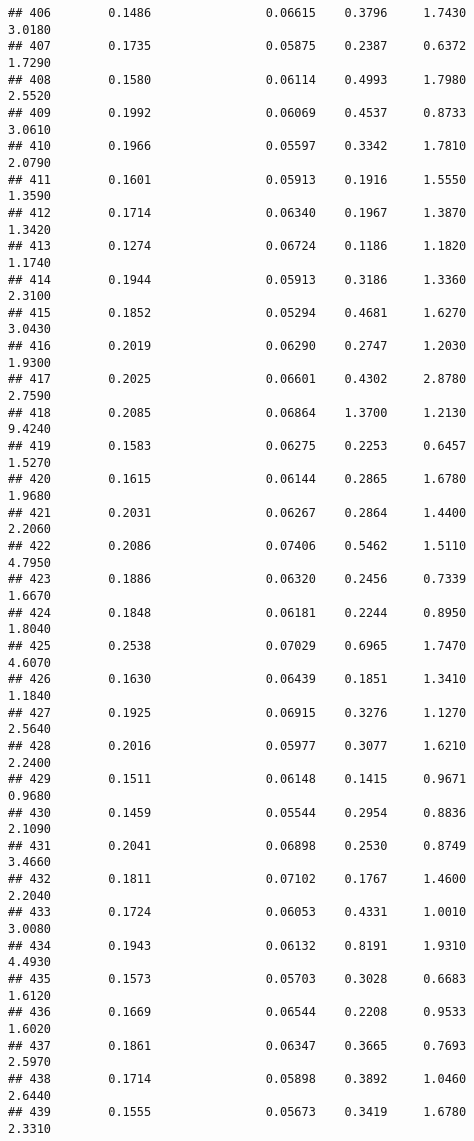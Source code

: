 \documentclass[
]{article}
\begin{document}
\begin{verbatim}
## 406        0.1486                0.06615    0.3796     1.7430       3.0180
## 407        0.1735                0.05875    0.2387     0.6372       1.7290
## 408        0.1580                0.06114    0.4993     1.7980       2.5520
## 409        0.1992                0.06069    0.4537     0.8733       3.0610
## 410        0.1966                0.05597    0.3342     1.7810       2.0790
## 411        0.1601                0.05913    0.1916     1.5550       1.3590
## 412        0.1714                0.06340    0.1967     1.3870       1.3420
## 413        0.1274                0.06724    0.1186     1.1820       1.1740
## 414        0.1944                0.05913    0.3186     1.3360       2.3100
## 415        0.1852                0.05294    0.4681     1.6270       3.0430
## 416        0.2019                0.06290    0.2747     1.2030       1.9300
## 417        0.2025                0.06601    0.4302     2.8780       2.7590
## 418        0.2085                0.06864    1.3700     1.2130       9.4240
## 419        0.1583                0.06275    0.2253     0.6457       1.5270
## 420        0.1615                0.06144    0.2865     1.6780       1.9680
## 421        0.2031                0.06267    0.2864     1.4400       2.2060
## 422        0.2086                0.07406    0.5462     1.5110       4.7950
## 423        0.1886                0.06320    0.2456     0.7339       1.6670
## 424        0.1848                0.06181    0.2244     0.8950       1.8040
## 425        0.2538                0.07029    0.6965     1.7470       4.6070
## 426        0.1630                0.06439    0.1851     1.3410       1.1840
## 427        0.1925                0.06915    0.3276     1.1270       2.5640
## 428        0.2016                0.05977    0.3077     1.6210       2.2400
## 429        0.1511                0.06148    0.1415     0.9671       0.9680
## 430        0.1459                0.05544    0.2954     0.8836       2.1090
## 431        0.2041                0.06898    0.2530     0.8749       3.4660
## 432        0.1811                0.07102    0.1767     1.4600       2.2040
## 433        0.1724                0.06053    0.4331     1.0010       3.0080
## 434        0.1943                0.06132    0.8191     1.9310       4.4930
## 435        0.1573                0.05703    0.3028     0.6683       1.6120
## 436        0.1669                0.06544    0.2208     0.9533       1.6020
## 437        0.1861                0.06347    0.3665     0.7693       2.5970
## 438        0.1714                0.05898    0.3892     1.0460       2.6440
## 439        0.1555                0.05673    0.3419     1.6780       2.3310

\end{verbatim}
\end{document}

